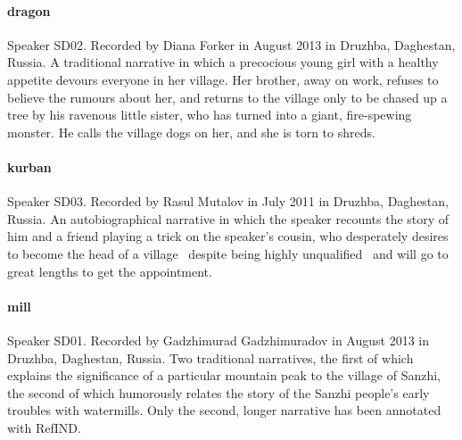 \paragraph{dragon}
Speaker SD02. Recorded by Diana Forker in August 2013 in Druzhba, Daghestan, Russia. A traditional narrative in which a precocious young girl with a healthy appetite devours everyone in her village. Her brother, away on work, refuses to believe the rumours about her, and returns to the village only to be chased up a tree by his ravenous little sister, who has turned into a giant, fire-spewing monster. He calls the village dogs on her, and she is torn to shreds.

%

\paragraph{kurban}
Speaker SD03. Recorded by Rasul Mutalov in July 2011 in Druzhba, Daghestan, Russia. An autobiographical narrative in which the speaker recounts the story of him and a friend playing a trick on the speaker's cousin, who desperately desires to become the head of a village \tnd\ despite being highly unqualified \tnd\ and will go to great lengths to get the appointment.

\paragraph{mill}
Speaker SD01. Recorded by Gadzhimurad Gadzhimuradov in August 2013 in Druzhba, Daghestan, Russia. Two traditional narratives, the first of which explains the significance of a particular mountain peak to the village of Sanzhi, the second of which humorously relates the story of the Sanzhi people's early troubles with watermills.
%
Only the second, longer narrative has been annotated with RefIND.

